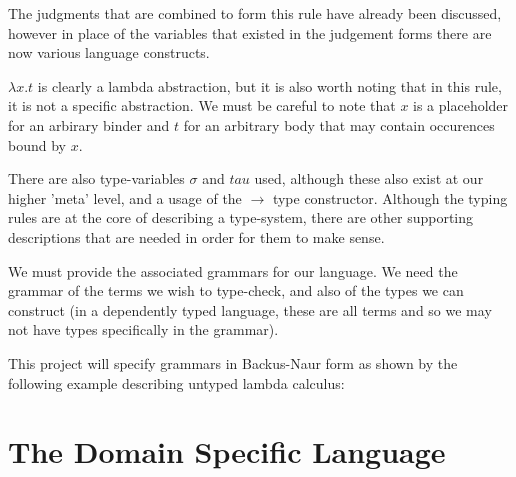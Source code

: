 The judgments that are combined to form this rule have already been
discussed, however in place of the variables that existed in the
judgement forms there are now various language constructs.

$\lambda x . t$ is clearly a lambda abstraction, but it is also worth
noting that in this rule, it is not a specific abstraction. We must be
careful to note that $x$ is a placeholder for an arbirary binder and
$t$ for an arbitrary body that may contain occurences bound by $x$.

There are also type-variables $\sigma$ and $tau$ used, although these
also exist at our higher 'meta' level, and a usage of the $\to$ type
constructor. Although the typing rules are at the core of describing a
type-system, there are other supporting descriptions that are needed
in order for them to make sense.

We must provide the associated grammars for our language. We need the
grammar of the terms we wish to type-check, and also of the types we
can construct (in a dependently typed language, these are all terms
and so we may not have types specifically in the grammar).

This project will specify grammars in Backus-Naur form as shown by the
following example describing untyped lambda calculus:

\section{The Domain Specific Language}

